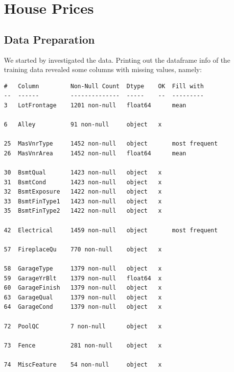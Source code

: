 \documentclass[a4paper, 12pt, twoside]{report}
\begin{document}
\clearpage

\section{House Prices}

\subsection{Data Preparation}
We started by investigated the data.
Printing out the dataframe info of the training data revealed some columns with missing values, namely:

\begin{Verbatim}[commandchars=\\\{\}]
#   Column         Non-Null Count  Dtype    OK  Fill with
--  ------         --------------  -----    --  ---------
3   LotFrontage    1201 non-null   float64      mean

6   Alley          91 non-null     object   x

25  MasVnrType     1452 non-null   object       most frequent
26  MasVnrArea     1452 non-null   float64      mean

30  BsmtQual       1423 non-null   object   x
31  BsmtCond       1423 non-null   object   x
32  BsmtExposure   1422 non-null   object   x
33  BsmtFinType1   1423 non-null   object   x
35  BsmtFinType2   1422 non-null   object   x

42  Electrical     1459 non-null   object       most frequent

57  FireplaceQu    770 non-null    object   x

58  GarageType     1379 non-null   object   x
59  GarageYrBlt    1379 non-null   float64  x
60  GarageFinish   1379 non-null   object   x
63  GarageQual     1379 non-null   object   x
64  GarageCond     1379 non-null   object   x

72  PoolQC         7 non-null      object   x

73  Fence          281 non-null    object   x

74  MiscFeature    54 non-null     object   x
\end{Verbatim}
\end{document}
